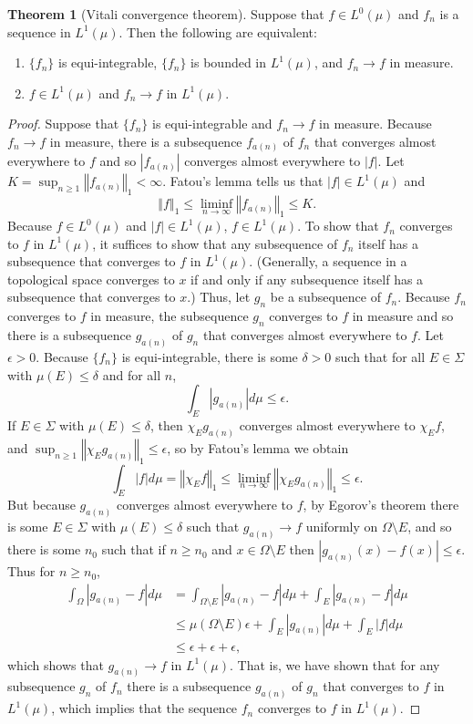 \documentclass{article}
\newcommand{\norm}[1]{\left\Vert #1 \right\Vert}
\theoremstyle{definition}
\newtheorem{theorem}{Theorem}
\theoremstyle{definition}
\begin{document}
\begin{theorem}[Vitali convergence theorem]
Suppose that $f \in L^0(\mu)$ and $f_n$ is a sequence in $L^1(\mu)$. Then the following are equivalent:
\begin{enumerate}
\item $\{f_n\}$ is equi-integrable, $\{f_n\}$ is bounded in $L^1(\mu)$, and $f_n \to f$ in measure. 
\item $f \in L^1(\mu)$ and $f_n \to f$ in $L^1(\mu)$. 
\end{enumerate}
\end{theorem}
\begin{proof}
Suppose that $\{f_n\}$ is equi-integrable and $f_n \to f$ in measure.
Because $f_n \to f$ in measure, there is a subsequence $f_{a(n)}$ of $f_n$ that converges
almost everywhere to $f$ and so $|f_{a(n)}|$ converges almost everywhere to $|f|$.
Let
$K=\sup_{n \geq 1} \norm{f_{a(n)}}_1<\infty$. 
Fatou's lemma tells us that 
$|f| \in L^1(\mu)$ and
\[
\norm{f}_1 \leq \liminf_{n \to \infty} \norm{f_{a(n)}}_1 \leq K.
\]
Because $f \in L^0(\mu)$ and $|f| \in L^1(\mu)$, $f \in L^1(\mu)$. 
To show that $f_n$ converges to $f$ in $L^1(\mu)$, it suffices to show that
any subsequence of $f_n$ itself has a subsequence that converges to $f$ in $L^1(\mu)$. (Generally, a sequence in a topological space
converges to $x$ if and only if any subsequence itself has a subsequence that converges to $x$.)
Thus, let $g_n$ be a subsequence of $f_n$. Because $f_n$ converges to $f$ in measure, the subsequence $g_n$ converges
to $f$ in measure and so there is a subsequence $g_{a(n)}$ of $g_n$ that converges almost everywhere to $f$. 
Let $\epsilon>0$. Because $\{f_n\}$ is equi-integrable, there is some $\delta>0$ such that for all $E \in \Sigma$ with
$\mu(E) \leq \delta$ and for all $n$,
\[
\int_E |g_{a(n)}| d\mu \leq \epsilon.
\]
If $E \in \Sigma$ with $\mu(E) \leq \delta$, then $\chi_E g_{a(n)}$ converges almost
everywhere to $\chi_E f$, and $\sup_{n \geq 1} \norm{\chi_E g_{a(n)}}_1 \leq \epsilon$, so
by Fatou's lemma we obtain 
\[
\int_E |f| d\mu = \norm{\chi_E f}_1 \leq \liminf_{n \to \infty} \norm{\chi_E g_{a(n)}}_1
\leq \epsilon.
\]
But because $g_{a(n)}$ converges almost everywhere to $f$, 
by Egorov's theorem there is some $E \in \Sigma$ with $\mu(E) \leq \delta$ such that
$g_{a(n)} \to f$ uniformly on $\Omega \setminus E$, and so there is some $n_0$ such that
if $n \geq n_0$ and $x \in \Omega \setminus E$ then 
$|g_{a(n)}(x)-f(x)| \leq \epsilon$. Thus for $n \geq n_0$,
\begin{align*}
\int_\Omega |g_{a(n)}-f| d\mu&=
\int_{\Omega \setminus E} |g_{a(n)}-f| d\mu
+\int_E |g_{a(n)}-f| d\mu\\
&\leq \mu(\Omega \setminus E) \epsilon+\int_E |g_{a(n)}| d\mu
+\int_E |f| d\mu\\
&\leq \epsilon+\epsilon+\epsilon,
\end{align*}
which shows that $g_{a(n)} \to f$ in $L^1(\mu)$. That is, we have shown that for any subsequence
$g_n$ of $f_n$ there is a subsequence $g_{a(n)}$ of $g_n$ that converges to $f$ in $L^1(\mu)$, which implies that
the sequence $f_n$ converges to $f$ in $L^1(\mu)$. 


\end{proof}
\end{document}

